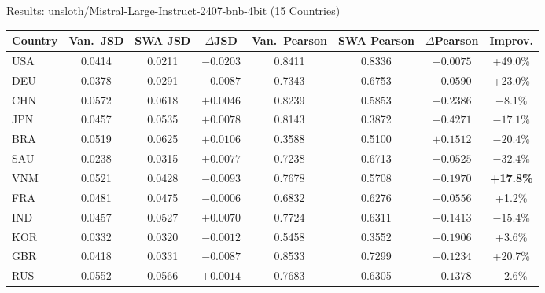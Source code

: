 \documentclass[11pt, aspectratio=169]{beamer}
\begin{document}
\begin{frame}{Results: unsloth/Mistral-Large-Instruct-2407-bnb-4bit (15 Countries)}

\begin{table}
\centering
\scriptsize
\renewcommand{\arraystretch}{1.05}
\begin{tabular}{@{}l cc c cc c c@{}}
\toprule
\textbf{Country} & \textbf{Van.\ JSD} & \textbf{SWA JSD} & \textbf{$\Delta$JSD} & \textbf{Van.\ Pearson} & \textbf{SWA Pearson} & \textbf{$\Delta$Pearson} & \textbf{Improv.} \\
\midrule
USA & 0.0414 & 0.0211 & $-0.0203$ & 0.8411 & 0.8336 & \textcolor{alertred}{$-0.0075$} & \textcolor{cbGreen}{+49.0\%} \\
DEU & 0.0378 & 0.0291 & $-0.0087$ & 0.7343 & 0.6753 & \textcolor{alertred}{$-0.0590$} & \textcolor{cbGreen}{+23.0\%} \\
CHN & 0.0572 & 0.0618 & \textcolor{alertred}{$+0.0046$} & 0.8239 & 0.5853 & \textcolor{alertred}{$-0.2386$} & \textcolor{alertred}{$-8.1\%$} \\
JPN & 0.0457 & 0.0535 & \textcolor{alertred}{$+0.0078$} & 0.8143 & 0.3872 & \textcolor{alertred}{$-0.4271$} & \textcolor{alertred}{$-17.1\%$} \\
BRA & 0.0519 & 0.0625 & \textcolor{alertred}{$+0.0106$} & 0.3588 & 0.5100 & $+0.1512$ & \textcolor{alertred}{$-20.4\%$} \\
SAU & 0.0238 & 0.0315 & \textcolor{alertred}{$+0.0077$} & 0.7238 & 0.6713 & \textcolor{alertred}{$-0.0525$} & \textcolor{alertred}{$-32.4\%$} \\
\rowcolor{lightgray}
VNM & 0.0521 & 0.0428 & $-0.0093$ & 0.7678 & 0.5708 & \textcolor{alertred}{$-0.1970$} & \textcolor{cbGreen}{\textbf{+17.8\%}} \\
FRA & 0.0481 & 0.0475 & $-0.0006$ & 0.6832 & 0.6276 & \textcolor{alertred}{$-0.0556$} & \textcolor{cbGreen}{+1.2\%} \\
IND & 0.0457 & 0.0527 & \textcolor{alertred}{$+0.0070$} & 0.7724 & 0.6311 & \textcolor{alertred}{$-0.1413$} & \textcolor{alertred}{$-15.4\%$} \\
KOR & 0.0332 & 0.0320 & $-0.0012$ & 0.5458 & 0.3552 & \textcolor{alertred}{$-0.1906$} & \textcolor{cbGreen}{+3.6\%} \\
GBR & 0.0418 & 0.0331 & $-0.0087$ & 0.8533 & 0.7299 & \textcolor{alertred}{$-0.1234$} & \textcolor{cbGreen}{+20.7\%} \\
RUS & 0.0552 & 0.0566 & \textcolor{alertred}{$+0.0014$} & 0.7683 & 0.6305 & \textcolor{alertred}{$-0.1378$} & \textcolor{alertred}{$-2.6\%$} \\

\end{tabular}
\end{table}
\end{frame}
\end{document}
